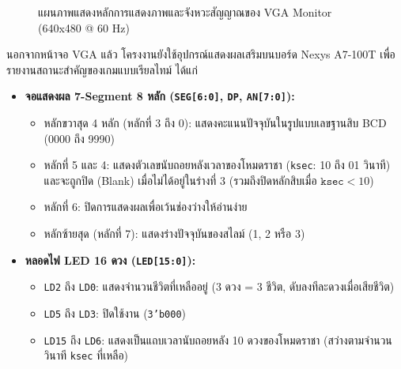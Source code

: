 \begin{figure}[H]
    \centering
    \caption{แผนภาพแสดงหลักการแสดงภาพและจังหวะสัญญาณของ VGA Monitor (640x480 @ 60 Hz)}
    \label{fig:vga_timing}
\end{figure}

นอกจากหน้าจอ VGA แล้ว โครงงานยังใช้อุปกรณ์แสดงผลเสริมบนบอร์ด Nexys A7-100T เพื่อรายงานสถานะสำคัญของเกมแบบเรียลไทม์ ได้แก่

\begin{itemize}[leftmargin=1.5cm]
    \item \textbf{จอแสดงผล 7-Segment 8 หลัก (\texttt{SEG[6:0]}, \texttt{DP}, \texttt{AN[7:0]}):}
    \begin{itemize}
        \item หลักขวาสุด 4 หลัก (หลักที่ 3 ถึง 0): แสดงคะแนนปัจจุบันในรูปแบบเลขฐานสิบ BCD (0000 ถึง 9990)
        \item หลักที่ 5 และ 4: แสดงตัวเลขนับถอยหลังเวลาของโหมดราชา (\texttt{ksec}: 10 ถึง 01 วินาที) และจะถูกปิด (Blank) เมื่อไม่ได้อยู่ในร่างที่ 3 (รวมถึงปิดหลักสิบเมื่อ $\texttt{ksec} < 10$)
        \item หลักที่ 6: ปิดการแสดงผลเพื่อเว้นช่องว่างให้อ่านง่าย
        \item หลักซ้ายสุด (หลักที่ 7): แสดงร่างปัจจุบันของสไลม์ (1, 2 หรือ 3)
    \end{itemize}
    \item \textbf{หลอดไฟ LED 16 ดวง (\texttt{LED[15:0]}):}
    \begin{itemize}
        \item \texttt{LD2} ถึง \texttt{LD0}: แสดงจำนวนชีวิตที่เหลืออยู่ (3 ดวง = 3 ชีวิต, ดับลงทีละดวงเมื่อเสียชีวิต)
        \item \texttt{LD5} ถึง \texttt{LD3}: ปิดใช้งาน (\texttt{3'b000})
        \item \texttt{LD15} ถึง \texttt{LD6}: แสดงเป็นแถบเวลานับถอยหลัง 10 ดวงของโหมดราชา (สว่างตามจำนวนวินาที \texttt{ksec} ที่เหลือ)
    \end{itemize}
\end{itemize}
